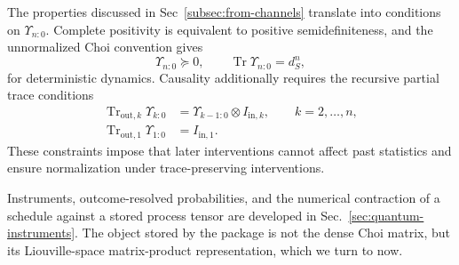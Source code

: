 The properties discussed in Sec~\ref{subsec:from-channels} translate into conditions on \(\Upsilon_{n:0}\).
Complete positivity is equivalent to positive semidefiniteness, and the unnormalized Choi convention gives
%
\begin{equation}
    \Upsilon_{n:0} \succeq 0, \qquad \operatorname{Tr} \Upsilon_{n:0} = d^n_S,
\end{equation}
%
for deterministic dynamics.
Causality additionally requires the recursive partial trace conditions
%
\begin{equation}
    \begin{aligned}
        \operatorname{Tr}_{\mathrm{out},k} \Upsilon_{k:0} &= \Upsilon_{k-1:0} \otimes I_{\mathrm{in},k}, \qquad k = 2, \dots, n, \\ \operatorname{Tr}_{\mathrm{out},1} \Upsilon_{1:0} &= I_{\mathrm{in},1}.
    \end{aligned}
\end{equation}
%
These constraints impose that later interventions cannot affect past statistics and ensure normalization under trace-preserving interventions.

%
Instruments, outcome-resolved probabilities, and the numerical contraction of a schedule against a stored process tensor are developed in Sec.~\ref{sec:quantum-instruments}.
The object stored by the package is not the dense Choi matrix, but its Liouville-space matrix-product representation, which we turn to now.
\label{subsec:pt-anatomy}

